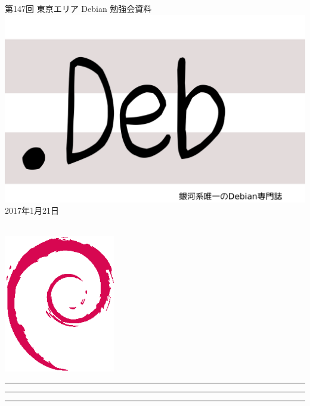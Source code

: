 \documentclass[mingoth,a4paper]{jsarticle}
\newcommand{\debmtgyear}{2017}
\newcommand{\debmtgmonth}{1}
\newcommand{\debmtgdate}{21}
\newcommand{\debmtgnumber}{147}
\begin{document}
\begin{titlepage}
\thispagestyle{empty}

\vspace*{-2cm}
第\debmtgnumber{}回 東京エリア Debian 勉強会資料\\
\hspace*{-2cm}
\includegraphics{image2012-natsu/dotdeb.pdf}\\
\hfill{}\debmtgyear{}年\debmtgmonth{}月\debmtgdate{}日

\\

\vspace*{-2cm}
\hfill{}\includegraphics[height=6cm]{image200502/openlogo-nd.eps}
\end{titlepage}

\newpage

\begin{minipage}[b]{0.2\hsize}
 \colorbox{titleback}{}
\end{minipage}
\begin{minipage}[b]{0.8\hsize}
\hrule
\vspace{2mm}
\hrule
\begin{multicols}{2}
\tableofcontents
\end{multicols}
\vspace{2mm}
\hrule
\end{minipage}
\end{document}
